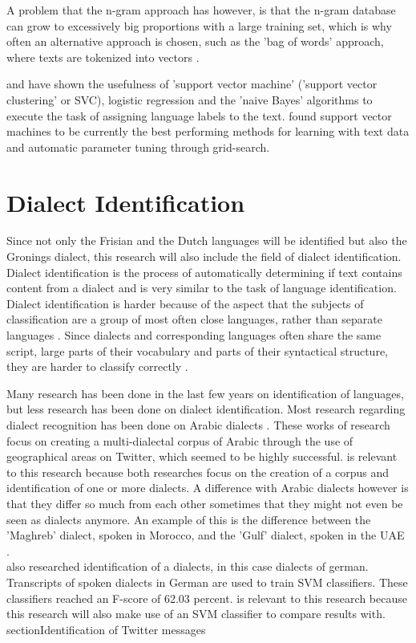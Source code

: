 \documentclass[
10pt, %
a4paper, %
oneside, %
headinclude,footinclude, %
] {book}%
\begin{document}
A problem that the n-gram approach has however, is that the n-gram database can grow to excessively big proportions with a large training set, which is why often an alternative approach is chosen, such as the 'bag of words' approach, where texts are tokenized into vectors \citep{scott}.

\citet{joachims} and \citet{silva} have shown the usefulness of 'support vector machine' ('support vector clustering' or SVC), logistic regression and the 'naive Bayes' algorithms to execute the task of assigning language labels to the text. \citet{joachims} found support vector machines to be currently the best performing methods for learning with text data and automatic parameter tuning through grid-search. 


\section{Dialect Identification}

Since not only the Frisian and the Dutch languages will be identified but also the Gronings dialect, this research will also include the field of dialect identification.  Dialect identification is the process of automatically determining if text contains content from a dialect and is very similar to the task of language identification. Dialect identification is harder because of the aspect that the subjects of classification are a group of most often close languages, rather than separate languages \citep{zaidan}. Since dialects and corresponding languages often share the same script, large parts of their vocabulary and parts of their syntactical structure, they are harder to classify correctly \citep{zaidan}.

Many research has been done in the last few years on identification of languages, but less research has been done on dialect identification. Most research regarding dialect recognition has been done on Arabic dialects\citet{arabic1} \citep{arabic2}. These works of research focus on creating a multi-dialectal corpus of Arabic through the use of geographical areas on Twitter, which seemed to be highly successful. \citet{arabic1} is relevant to this research because both researches focus on the creation of a corpus and identification of one or more dialects.
A difference with Arabic dialects however is that they differ so much from each other sometimes that they might not even be seen as dialects anymore. An example of this is the difference between the 'Maghreb' dialect, spoken in Morocco, and the 'Gulf' dialect, spoken in the UAE \citep{arabic1}. \\
 \citet{ciobanu-etal-2018-german} also researched identification of a dialects, in this case dialects of german.  Transcripts of spoken dialects in German are used to train SVM classifiers. These classifiers reached an F-score of 62.03 percent. \citet{ciobanu-etal-2018-german} is relevant to this research because this research will also make use of an SVM classifier to compare results with. \\section{Identification of Twitter messages}
\end{document}

